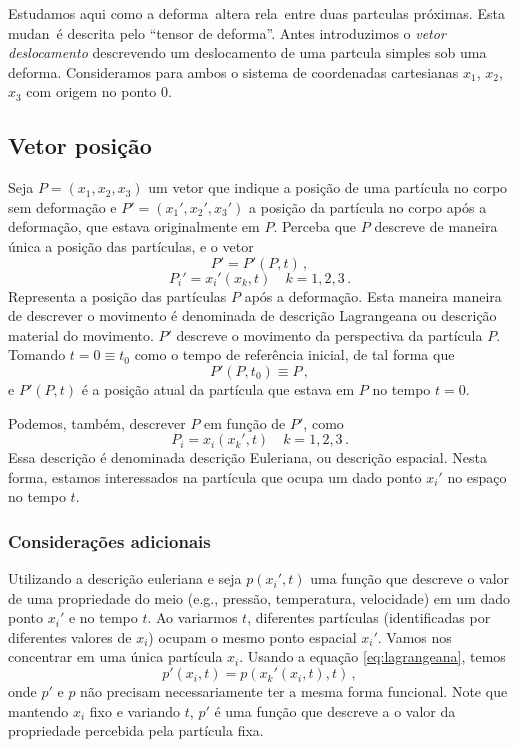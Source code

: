 Estudamos aqui como a deforma\cao\ altera rela\coes\ entre
duas part\ih culas pr\'oximas. Esta mudan\ca\
\'e descrita pelo ``tensor de deforma\cao''. Antes
introduzimos o {\it vetor deslocamento} descrevendo um
deslocamento de uma part\ih cula simples sob uma
deforma\cao. Consideramos para ambos o sistema de
coordenadas cartesianas $x_1$, $x_2$, $x_3$ com origem no ponto 0.

\subsection{Vetor posi\c{c}\~ao}
Seja $P = (x_1,x_2,x_3)$ um vetor que indique a posi\c{c}\~ao de uma part\'icula
no corpo sem deforma\c{c}\~ao e $P'=(x_1',x_2',x_3')$ a posi\c{c}\~ao da
part\'icula no corpo ap\'os a deforma\c{c}\~ao, que estava originalmente em $P$. Perceba que $P$
descreve de maneira \'unica a posi\c{c}\~ao das part\'iculas, e o vetor
\begin{equation}
  P' = P'(P,t)\, ,
\end{equation}
\begin{equation}
  P_i' = x_i'(x_k,t) \quad k=1,2,3\, . \label{eq:lagrangeana}
\end{equation}
Representa a posi\c{c}\~ao das part\'iculas $P$ ap\'os a deforma\c{c}\~ao. 
Esta maneira maneira de descrever o movimento
\'e denominada de descri\c{c}\~ao Lagrangeana ou descri\c{c}\~ao material do
movimento. $P'$ descreve o movimento da perspectiva da part\'icula $P$.
Tomando $t = 0 \equiv t_0$ como o tempo de refer\^encia inicial, de tal forma
que
\begin{equation}
  P'(P,t_0) \equiv P \, ,
\end{equation}
e $P'(P,t)$ \'e a posi\c{c}\~ao atual da part\'icula que estava em $P$ no tempo
$t=0$.

Podemos, tamb\'em, descrever $P$ em fun\c{c}\~ao de $P'$, como
\begin{equation}
  P_i = x_i(x_k',t) \quad k=1,2,3\, . \label{eq:euleriana}
\end{equation}
Essa descri\c{c}\~ao \'e denominada descri\c{c}\~ao Euleriana, ou
descri\c{c}\~ao espacial. Nesta forma, estamos interessados na part\'icula que
ocupa um dado ponto $x_ i'$ no espa\c{c}o no tempo $t$.

\subsubsection{Considera\c{c}\~oes adicionais}
Utilizando a descri\c{c}\~ao euleriana e seja $p(x_i',t)$ uma fun\c{c}\~ao que
descreve o valor de uma propriedade do meio (e.g., press\~ao, temperatura,
velocidade) em um dado ponto $x_i'$ e no tempo $t$. Ao variarmos $t$,
diferentes part\'iculas (identificadas por diferentes valores de $x_i$) ocupam o
mesmo ponto espacial $x_i'$. Vamos nos concentrar em uma \'unica part\'icula
$x_i$. Usando a equa\c{c}\~ao \ref{eq:lagrangeana}, temos
\begin{equation}
  p'(x_i,t) = p(x_k'(x_i,t),t)\, ,
\end{equation}
onde $p'$ e $p$ n\~ao precisam necessariamente ter a mesma forma funcional. Note
que mantendo $x_i$ fixo e variando $t$, $p'$ \'e uma fun\c{c}\~ao que descreve a
o valor da propriedade percebida pela part\'icula fixa.

